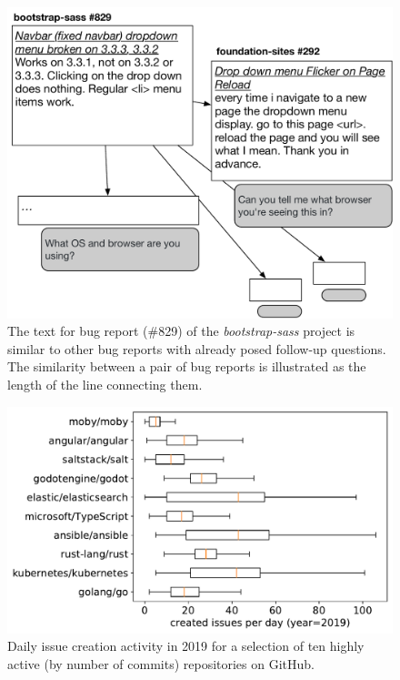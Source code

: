 \begin{figure}[t]
\centering
\includegraphics[width=0.99\linewidth]{figures/br_motivation.pdf}
\caption{The text for bug report (\#829) of the {\em bootstrap-sass} project is similar to other bug reports with already posed follow-up questions. The similarity between a pair of bug reports is illustrated as the length of the line connecting them.}
\label{fig:motivation}
\end{figure}

\begin{figure}[t]
\centering
\includegraphics[width=0.99\linewidth]{figures/popular_repos.pdf}
\caption{Daily issue creation activity in 2019 for a selection of ten highly active
(by number of commits) repositories on GitHub.}
\label{fig:repo_activity}
\end{figure}

